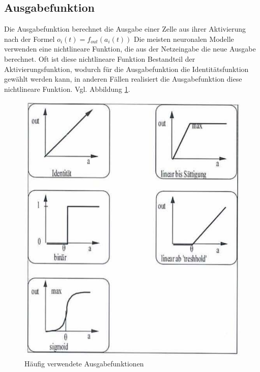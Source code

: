 \subsection*{Ausgabefunktion}
Die Ausgabefunktion berechnet die Ausgabe einer Zelle aus ihrer Aktivierung nach
der Formel $o_i(t) = f_{out}(a_i(t))$
Die meisten neuronalen Modelle verwenden eine nichtlineare Funktion, die aus der
Netzeingabe die neue Ausgabe berechnet. Oft ist diese nichtlineare Funktion
Bestandteil der Aktivierungsfunktion, wodurch für die Ausgabefunktion die
Identitätsfunktion gewählt werden kann, in anderen Fällen realisiert die
Ausgabefunktion diese nichtlineare Funktion. Vgl. Abbildung \ref{fig:ausgabefunktionen}.
\begin{figure}[ht!] \centering 
	\includegraphics[width=\linewidth]{figures/ch01_Ausgabefunktion.png}
	\caption{Häufig verwendete Ausgabefunktionen}
	\label{fig:ausgabefunktionen}
\end{figure}

